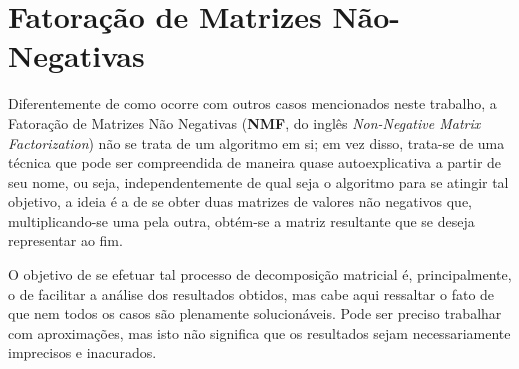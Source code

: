 \section{Fatoração de Matrizes Não-Negativas}
\label{sec:bss_nmf}

Diferentemente de como ocorre com outros casos mencionados neste trabalho, a Fatoração de Matrizes Não Negativas (\textbf{NMF}, do inglês \textit{Non-Negative Matrix Factorization}) não se trata de um algoritmo em si; em vez disso, trata-se de uma técnica que pode ser compreendida de maneira quase autoexplicativa a partir de seu nome, ou seja, independentemente de qual seja o algoritmo para se atingir tal objetivo, a ideia é a de se obter duas matrizes de valores não negativos que, multiplicando-se uma pela outra, obtém-se a matriz resultante que se deseja representar ao fim.


O objetivo de se efetuar tal processo de decomposição matricial é, principalmente, o de facilitar a análise dos resultados obtidos, mas cabe aqui ressaltar o fato de que nem todos os casos são plenamente solucionáveis. Pode ser preciso trabalhar com aproximações, mas isto não significa que os resultados sejam necessariamente imprecisos e inacurados.
